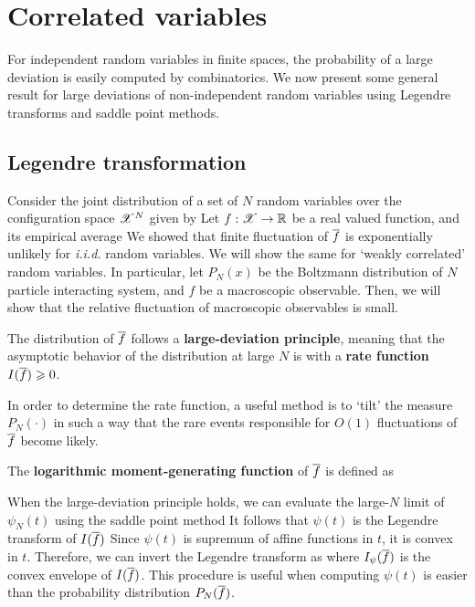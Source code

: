 \documentclass[letterpaper,english,10pt]{article}
\begin{document}
\section{Correlated variables}
For independent random variables in finite spaces, 
the probability of a large deviation is easily computed by combinatorics. 
We now present some general result for large deviations of non-independent random variables using  Legendre transforms and saddle point methods. 

\subsection{Legendre transformation} 
Consider the joint distribution of a set of $N$ random variables over the configuration space $\mathscr{X}^N$ given by 
Let $f: \mathscr{X} \to \mathbb{R}$ be a real valued function, and its empirical average 
We showed that finite fluctuation of $\overline{f}$ is exponentially unlikely for \emph{i.i.d.} random variables. 
We will show the same for `weakly correlated' random variables. 
In particular, let $P_N(x)$ be the Boltzmann distribution of $N$ particle interacting system, and $f$ be a macroscopic observable. 
Then, we will show that the relative fluctuation of macroscopic observables is small. 
\begin{assum}
The distribution of $\overline{f}$ follows a \textbf{large-deviation principle}, meaning that the asymptotic behavior of the distribution at large $N$ is 
with a \textbf{rate function} $I(\overline{f}) \geqslant 0$. 
\end{assum}
In order to determine the rate function, a useful method is to `tilt' the measure $P_N(\cdot)$ in such
a way that the rare events responsible for $O(1)$ fluctuations of $\overline{f}$ become likely. 
\begin{defn} 
The \textbf{logarithmic moment-generating function} of $\overline{f}$ is defined as 
\end{defn}
When the large-deviation principle holds, we can evaluate the large-$N$ limit of $\psi_N(t)$ using the saddle point method
It follows that $\psi(t)$ is the Legendre transform of $I(\overline{f})$
Since $\psi(t)$ is supremum of affine functions in $t$, it is convex in $t$. 
Therefore, we can invert the Legendre transform as 
where $I_\psi(\overline{f})$ is the convex envelope of $I(\overline{f})$. 
This procedure is useful when computing $\psi(t)$ is easier than the probability distribution $P_N(\overline{f})$.
\end{document}
